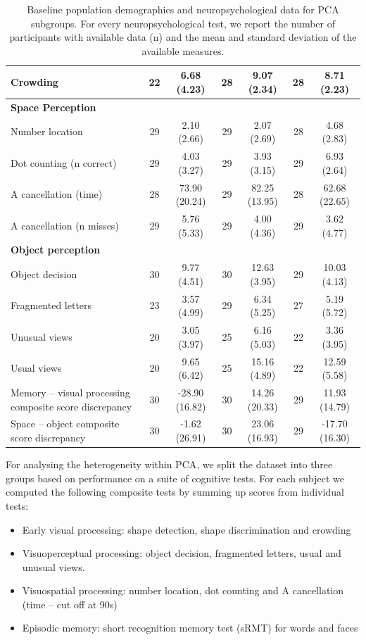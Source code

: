\begin{table}
\begin{tabular}{C{5cm}|c|c|c|c|c|c}
Crowding &  22 &      6.68 (4.23) &  28 &     9.07 (2.34) &  28 &      8.71 (2.23) \\
\hline
\textbf{Space Perception} & & & & & \\
Number location &  29 &      2.10 (2.66) &  29 &     2.07 (2.69) &  28 &      4.68 (2.83) \\
Dot counting (n correct) &  29 &      4.03 (3.27) &  29 &     3.93 (3.15) &  29 &      6.93 (2.64) \\
A cancellation (time) &  28 &    73.90 (20.24) &  29 &   82.25 (13.95) &  28 &    62.68 (22.65) \\
A cancellation (n misses) &  29 &      5.76 (5.33) &  29 &     4.00 (4.36) &  29 &      3.62 (4.77) \\
\hline
\textbf{Object perception} & & & & & \\
Object decision &  30 &      9.77 (4.51) &  30 &    12.63 (3.95) &  29 &     10.03 (4.13) \\
Fragmented letters &  23 &      3.57 (4.99) &  29 &     6.34 (5.25) &  27 &      5.19 (5.72) \\
Unusual views &  20 &      3.05 (3.97) &  25 &     6.16 (5.03) &  22 &      3.36 (3.95) \\
Usual views &  20 &      9.65 (6.42) &  25 &    15.16 (4.89) &  22 &     12.59 (5.58) \\
\hline
Memory -- visual processing composite score discrepancy &  30 &   -28.90 (16.82) &  30 &   14.26 (20.33) &  29 &    11.93 (14.79) \\
Space -- object composite score discrepancy  &  30 &    -1.62 (26.91) &  30 &   23.06 (16.93) &  29 &   -17.70 (16.30) \\
\end{tabular}
\caption[Baseline population demographics for PCA subgroups]{Baseline population demographics and neuropsychological data for PCA subgroups. For every neuropsychological test, we report the number of participants with available data (n) and the mean and standard deviation of the available measures.}
\label{tab:pcaSubgrDemographics}
\end{table}



For analysing the heterogeneity within PCA, we split the dataset into three groups based on performance on a suite of cognitive tests. For each subject we computed the following composite tests by summing up scores from individual tests:
\begin{itemize}
 \item Early visual processing: shape detection, shape discrimination and crowding
 \item Visuoperceptual processing: object decision, fragmented letters, usual and unusual views.
 \item Visuospatial processing: number location, dot counting and A cancellation (time -- cut off at 90s)
 \item Episodic memory: short recognition memory test (sRMT) for words and faces
\end{itemize}

